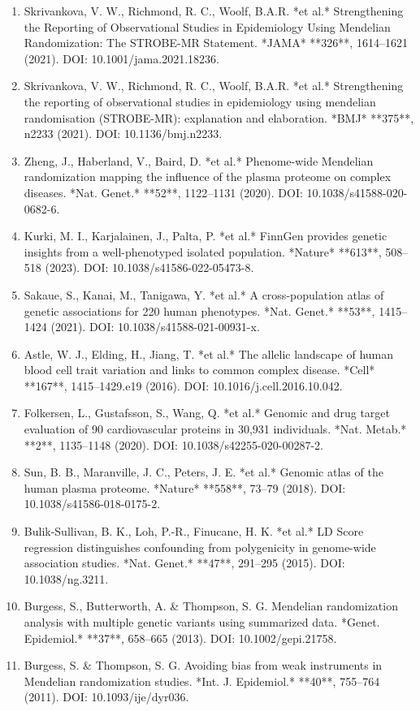 \documentclass[11pt]{article}
\begin{document}
\begin{enumerate}
\item Skrivankova, V. W., Richmond, R. C., Woolf, B.A.R. *et al.* Strengthening the Reporting of Observational Studies in Epidemiology Using Mendelian Randomization: The STROBE-MR Statement. *JAMA* **326**, 1614--1621 (2021). DOI: 10.1001/jama.2021.18236.
\item Skrivankova, V. W., Richmond, R. C., Woolf, B.A.R. *et al.* Strengthening the reporting of observational studies in epidemiology using mendelian randomisation (STROBE-MR): explanation and elaboration. *BMJ* **375**, n2233 (2021). DOI: 10.1136/bmj.n2233.
\item Zheng, J., Haberland, V., Baird, D. *et al.* Phenome-wide Mendelian randomization mapping the influence of the plasma proteome on complex diseases. *Nat. Genet.* **52**, 1122--1131 (2020). DOI: 10.1038/s41588-020-0682-6.
\item Kurki, M. I., Karjalainen, J., Palta, P. *et al.* FinnGen provides genetic insights from a well-phenotyped isolated population. *Nature* **613**, 508--518 (2023). DOI: 10.1038/s41586-022-05473-8.
\item Sakaue, S., Kanai, M., Tanigawa, Y. *et al.* A cross-population atlas of genetic associations for 220 human phenotypes. *Nat. Genet.* **53**, 1415--1424 (2021). DOI: 10.1038/s41588-021-00931-x.
\item Astle, W. J., Elding, H., Jiang, T. *et al.* The allelic landscape of human blood cell trait variation and links to common complex disease. *Cell* **167**, 1415--1429.e19 (2016). DOI: 10.1016/j.cell.2016.10.042.
\item Folkersen, L., Gustafsson, S., Wang, Q. *et al.* Genomic and drug target evaluation of 90 cardiovascular proteins in 30,931 individuals. *Nat. Metab.* **2**, 1135--1148 (2020). DOI: 10.1038/s42255-020-00287-2.
\item Sun, B. B., Maranville, J. C., Peters, J. E. *et al.* Genomic atlas of the human plasma proteome. *Nature* **558**, 73--79 (2018). DOI: 10.1038/s41586-018-0175-2.
\item Bulik-Sullivan, B. K., Loh, P.-R., Finucane, H. K. *et al.* LD Score regression distinguishes confounding from polygenicity in genome-wide association studies. *Nat. Genet.* **47**, 291--295 (2015). DOI: 10.1038/ng.3211.
\item Burgess, S., Butterworth, A. \& Thompson, S. G. Mendelian randomization analysis with multiple genetic variants using summarized data. *Genet. Epidemiol.* **37**, 658--665 (2013). DOI: 10.1002/gepi.21758.
\item Burgess, S. \& Thompson, S. G. Avoiding bias from weak instruments in Mendelian randomization studies. *Int. J. Epidemiol.* **40**, 755--764 (2011). DOI: 10.1093/ije/dyr036.

\end{enumerate}
\end{document}
